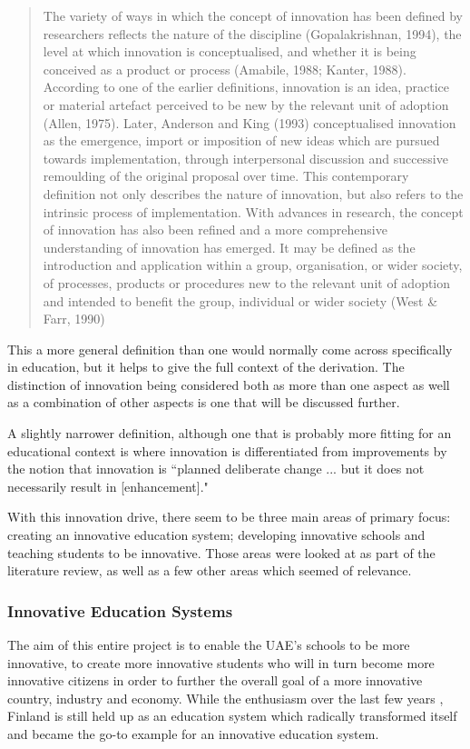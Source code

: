 \documentclass[11pt]{article}
\begin{document}
\begin{quote}
	The variety of ways in which the concept of innovation has been defined by researchers reflects the nature of the discipline (Gopalakrishnan, 1994), the level at which innovation is conceptualised, and whether it is being conceived as a product or process (Amabile, 1988; Kanter, 1988). According to one of the earlier definitions, innovation is an idea, practice or material artefact perceived to be new by the relevant unit of adoption (Allen, 1975). Later, Anderson and King (1993) conceptualised innovation as the emergence, import or imposition of new ideas which are pursued towards implementation, through interpersonal discussion and successive remoulding of the original proposal over time. This contemporary definition not only describes the nature of innovation, but also refers to the intrinsic process of implementation. With advances in research, the concept of innovation has also been refined and a more comprehensive understanding of innovation has emerged. It may be defined as the introduction and application within a group, organisation, or wider society, of processes, products or procedures new to the relevant unit of adoption and intended to benefit the group, individual or wider society (West \& Farr, 1990)
\end{quote}

This a more general definition than one would normally come across specifically in education, but it helps to give the full context of the derivation. The distinction of innovation being considered both as more than one aspect as well as a combination of other aspects is one that will be discussed further.

A slightly narrower definition, although one that is probably more fitting for an educational context is where innovation is differentiated from improvements by the notion that innovation is ``planned deliberate change ... but it does not necessarily result in [enhancement]." \citep{hannan2002innovative}

With this innovation drive, there seem to be three main areas of primary focus: creating an innovative education system; developing innovative schools and teaching students to be innovative. Those areas were looked at as part of the literature review, as well as a few other areas which seemed of relevance.

\subsubsection{Innovative Education Systems}
The aim of this entire project is to enable the UAE's schools to be more innovative, to create more innovative students who will in turn become more innovative citizens in order to further the overall goal of a more innovative country, industry and economy. While the enthusiasm over the last few years \citep{1_sahlgren_2013, 2_clark_2016, 3_anderson_2016}, Finland is still held up as an education system which radically transformed itself and became the go-to example for an innovative education system.
\end{document}
